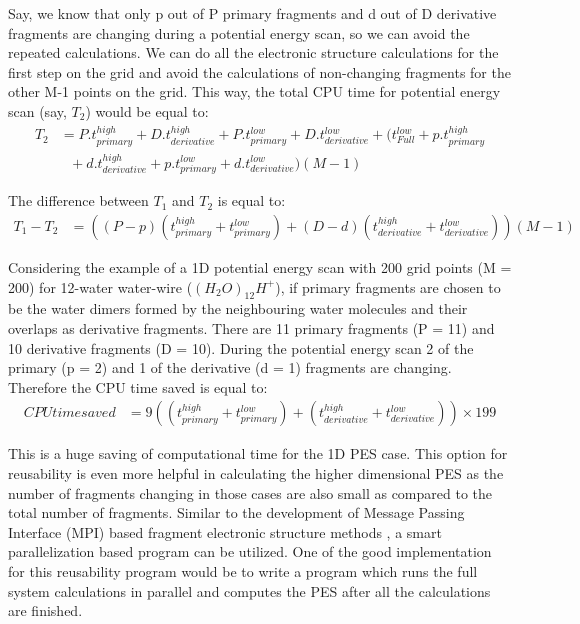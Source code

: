 Say, we know that only p out of P primary fragments and d out of D derivative fragments are changing
during a potential energy scan, so we can avoid the repeated calculations. We can do all the
 electronic structure calculations for the first step on the grid and avoid
the calculations of non-changing fragments for the other M-1 points on the grid. This way, the total CPU time for
potential energy scan (say, $T_{2}$) would be equal to:
\begin{equation}\label{eq:withReusabilityEqn2}
\left.\begin{aligned}
T_{2} &     =  P.t_{primary}^{high} + D.t_{derivative}^{high} + P.t_{primary}^{low} 
      + D.t_{derivative}^{low} + (t_{Full}^{low} + p.t_{primary}^{high}\\
      &  ~~~ + d.t_{derivative}^{high} + p.t_{primary}^{low} + d.t_{derivative}^{low}) (M-1)
\end{aligned}\right.
\end{equation}

The difference between $T_{1}$ and $T_{2}$ is equal to:
\begin{equation}\label{eq2}
\left.\begin{aligned}
T_{1} - T_{2} &     =  ((P-p)(t_{primary}^{high} + t_{primary}^{low}) + (D-d)(t_{derivative}^{high} +
 t_{derivative}^{low}))(M-1)
\end{aligned}\right.
\end{equation}

Considering the example of a 1D potential energy scan with 200 grid points (M = 200) for 12-water water-wire ($(H_{2}O)_{12}H^{+}$),
if primary fragments are chosen to be the water dimers formed by the neighbouring water molecules and their overlaps as
derivative fragments. There are 11 primary fragments (P = 11) and 10 derivative fragments (D = 10). During the potential energy scan
2 of the primary (p = 2) and 1 of the derivative (d = 1) fragments are changing.
Therefore the CPU time saved is equal to:
\begin{equation}\label{eq:withReusabilityEqn3}
\left.\begin{aligned}
CPU time saved & =  9((t_{primary}^{high} + t_{primary}^{low}) + (t_{derivative}^{high} + t_{derivative}^{low}))\times199
\end{aligned}\right.
\end{equation}

This is a huge saving of computational time for the 1D PES case. This option for reusability is even more helpful in calculating
the higher dimensional PES as the number of fragments changing in those cases are also small as compared to the total number of
fragments. Similar to the development of Message Passing Interface (MPI) based fragment electronic structure methods
\cite{fragAIMD-elbo,fragAIMD-CC}, a smart parallelization based program can be utilized. One of the good
implementation for this reusability program would be to write a program which runs the full system
calculations in parallel and computes the PES after all the calculations are finished.

\newpage
